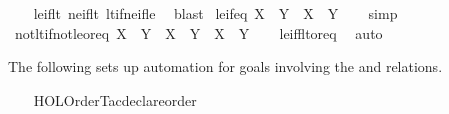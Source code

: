 \begin{isabellebody}
%
\isadelimproof
\ \ %
\endisadelimproof
%
\isatagproof
{}\isamarkupfalse%
\ le{\isacharunderscore}{\kern0pt}if{\isacharunderscore}{\kern0pt}lt\ ne{\isacharunderscore}{\kern0pt}if{\isacharunderscore}{\kern0pt}lt\ lt{\isacharunderscore}{\kern0pt}if{\isacharunderscore}{\kern0pt}ne{\isacharunderscore}{\kern0pt}if{\isacharunderscore}{\kern0pt}le\ \isamarkupfalse%
\ blast%
\endisatagproof
{\isafoldproof}%
%
\isadelimproof
\isanewline
%
\endisadelimproof
\isanewline
{}\isamarkupfalse%
\ le{\isacharunderscore}{\kern0pt}if{\isacharunderscore}{\kern0pt}eq{\isacharcolon}{\kern0pt}\ {\isachardoublequoteopen}X\ {\isacharequal}{\kern0pt}\ Y\ {\isasymLongrightarrow}\ X\ {\isasymle}\ Y{\isachardoublequoteclose}\isanewline
%
\isadelimproof
\ \ %
\endisadelimproof
%
\isatagproof
{}\isamarkupfalse%
\ simp%
\endisatagproof
{\isafoldproof}%
%
\isadelimproof
\isanewline
%
\endisadelimproof
\isanewline
{}\isamarkupfalse%
\ not{\isacharunderscore}{\kern0pt}lt{\isacharunderscore}{\kern0pt}if{\isacharunderscore}{\kern0pt}not{\isacharunderscore}{\kern0pt}le{\isacharunderscore}{\kern0pt}or{\isacharunderscore}{\kern0pt}eq{\isacharcolon}{\kern0pt}\ {\isachardoublequoteopen}{\isasymnot}{\isacharparenleft}{\kern0pt}X\ {\isacharless}{\kern0pt}\ Y{\isacharparenright}{\kern0pt}\ {\isasymlongleftrightarrow}\ {\isasymnot}{\isacharparenleft}{\kern0pt}X\ {\isasymle}\ Y{\isacharparenright}{\kern0pt}\ {\isasymor}\ X\ {\isacharequal}{\kern0pt}\ Y{\isachardoublequoteclose}\isanewline
%
\isadelimproof
\ \ %
\endisadelimproof
%
\isatagproof
{}\isamarkupfalse%
\ le{\isacharunderscore}{\kern0pt}iff{\isacharunderscore}{\kern0pt}lt{\isacharunderscore}{\kern0pt}or{\isacharunderscore}{\kern0pt}eq\ \isamarkupfalse%
\ auto%
\endisatagproof
{\isafoldproof}%
%
\isadelimproof
%
\endisadelimproof
%
\begin{isamarkuptext}%
The following sets up automation for goals involving the \isa{{\isacharparenleft}{\kern0pt}{\isasymle}{\isacharparenright}{\kern0pt}}
and \isa{{\isacharparenleft}{\kern0pt}{\isacharless}{\kern0pt}{\isacharparenright}{\kern0pt}} relations.%
\end{isamarkuptext}\isamarkuptrue%
%
\isadelimML
%
\endisadelimML
%
\isatagML
{}\isamarkupfalse%
\ {\isacartoucheopen}\isanewline
\ \ HOL{\isacharunderscore}{\kern0pt}Order{\isacharunderscore}{\kern0pt}Tac{\isachardot}{\kern0pt}declare{\isacharunderscore}{\kern0pt}order\ {\isacharbraceleft}{\kern0pt}\isanewline

\end{isabellebody}
